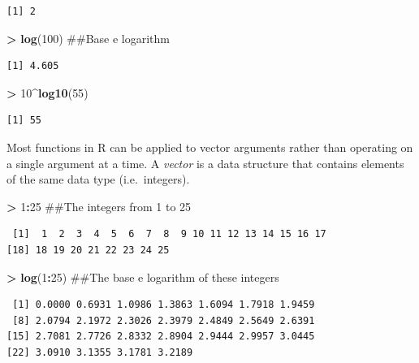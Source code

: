 \documentclass[]{krantz}
\makeatletter
\newenvironment{Shaded}{\begin{snugshade}}{\end{snugshade}}
\newcommand{\KeywordTok}[1]{\textcolor[rgb]{0.27,0.27,0.27}{\textbf{#1}}}
\newcommand{\DecValTok}[1]{\textcolor[rgb]{0.06,0.06,0.06}{#1}}
\newcommand{\StringTok}[1]{\textcolor[rgb]{0.5,0.5,0.5}{#1}}
\newcommand{\OperatorTok}[1]{\textcolor[rgb]{0.43,0.43,0.43}{\textbf{#1}}}
\newcommand{\NormalTok}[1]{#1}
\newenvironment{kframe}{%
\medskip{}
\setlength{\fboxsep}{.8em}
 \def\at@end@of@kframe{}%
 \ifinner\ifhmode%
  \def\at@end@of@kframe{\end{minipage}}%
  \begin{minipage}{\columnwidth}%
 \fi\fi%
 \def\FrameCommand##1{\hskip\@totalleftmargin \hskip-\fboxsep
 \colorbox{shadecolor}{##1}\hskip-\fboxsep
     \hskip-\linewidth \hskip-\@totalleftmargin \hskip\columnwidth}%
 \MakeFramed {\advance\hsize-\width
   \@totalleftmargin\z@ \linewidth\hsize
   \@setminipage}}%
 {\par\unskip\endMakeFramed%
 \at@end@of@kframe}
\renewenvironment{Shaded}{\begin{kframe}}{\end{kframe}}
\theoremstyle{definition}
\theoremstyle{definition}
\theoremstyle{definition}
\theoremstyle{remark}
\makeatother
\begin{document}
\begin{verbatim}
[1] 2
\end{verbatim}

\begin{Shaded}
\begin{Highlighting}[]
\OperatorTok{>}\StringTok{ }\KeywordTok{log}\NormalTok{(}\DecValTok{100}\NormalTok{)  ##Base e logarithm}
\end{Highlighting}
\end{Shaded}

\begin{verbatim}
[1] 4.605
\end{verbatim}

\begin{Shaded}
\begin{Highlighting}[]
\OperatorTok{>}\StringTok{ }\DecValTok{10}\OperatorTok{^}\KeywordTok{log10}\NormalTok{(}\DecValTok{55}\NormalTok{)}
\end{Highlighting}
\end{Shaded}

\begin{verbatim}
[1] 55
\end{verbatim}

Most functions in R can be applied to vector arguments rather than
operating on a single argument at a time. A \emph{vector} is a data
structure that contains elements of the same data type (i.e.~integers).

\begin{Shaded}
\begin{Highlighting}[]
\OperatorTok{>}\StringTok{ }\DecValTok{1}\OperatorTok{:}\DecValTok{25}\NormalTok{  ##The integers from 1 to 25}
\end{Highlighting}
\end{Shaded}

\begin{verbatim}
 [1]  1  2  3  4  5  6  7  8  9 10 11 12 13 14 15 16 17
[18] 18 19 20 21 22 23 24 25
\end{verbatim}

\begin{Shaded}
\begin{Highlighting}[]
\OperatorTok{>}\StringTok{ }\KeywordTok{log}\NormalTok{(}\DecValTok{1}\OperatorTok{:}\DecValTok{25}\NormalTok{)  ##The base e logarithm of these integers}
\end{Highlighting}
\end{Shaded}

\begin{verbatim}
 [1] 0.0000 0.6931 1.0986 1.3863 1.6094 1.7918 1.9459
 [8] 2.0794 2.1972 2.3026 2.3979 2.4849 2.5649 2.6391
[15] 2.7081 2.7726 2.8332 2.8904 2.9444 2.9957 3.0445
[22] 3.0910 3.1355 3.1781 3.2189
\end{verbatim}
\end{document}
